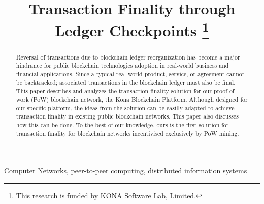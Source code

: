 \documentclass[conference]{IEEEtran}
\begin{document}
\title{Transaction Finality through Ledger Checkpoints 
	\thanks{This research is funded by KONA Software Lab, Limited.}
}

\author{
	\and		
	\and
}
\maketitle

\begin{abstract}
Reversal of transactions due to blockchain ledger reorganization has become a major hindrance for public blockchain technologies adoption in real-world business and financial applications. Since a typical real-world product, service, or agreement cannot be backtracked; associated transactions in the blockchain ledger must also be final. This paper describes and analyzes the transaction finality solution for our proof of work (PoW) blockchain network, the Kona Blockchain Platform. Although designed for our specific platform, the ideas from the solution can be easilly adapted to achieve transaction finality in existing public blockchain networks. This paper also discusses how this can be done. To the best of our knowledge, ours is the first solution for transaction finality for blockchain networks incentivised exclusively by PoW mining.    
\end{abstract}

\begin{IEEEkeywords}
Computer Networks, peer-to-peer computing, distributed information systems
\end{IEEEkeywords}


\end{document}
